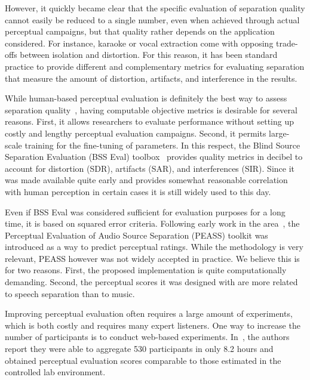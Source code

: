 However, it quickly became clear that the specific evaluation of separation quality cannot easily be reduced to a single number, even when achieved through actual perceptual campaigns, but that quality rather depends on the application considered. For instance, karaoke or vocal extraction come with opposing trade-offs between isolation and distortion. For this reason, it has been standard practice to provide different and complementary metrics for evaluating separation that measure the amount of distortion, artifacts, and interference in the results.

While human-based perceptual evaluation is definitely the best way to assess separation quality~\cite{vincent062,cano11}, having computable objective metrics is desirable for several reasons. First, it allows researchers to evaluate performance without setting up costly and lengthy perceptual evaluation campaigns. Second, it permits large-scale training for the fine-tuning of parameters. In this respect, the Blind Source Separation Evaluation (BSS Eval) toolbox~\cite{fevotte05a,vincent06} provides quality metrics in decibel to account for distortion (SDR), artifacts (SAR), and interferences (SIR). Since it was made available quite early and provides somewhat reasonable correlation with human perception in certain cases \cite{fox07,fox072} it is still widely used to this day.

Even if BSS Eval was considered sufficient for evaluation purposes for a long time, it is based on squared error criteria. Following early work in the area~\cite{kornycky08}, the Perceptual Evaluation of Audio Source Separation (PEASS) toolkit \cite{emiya10,emiya11,vincent122} was introduced as a way to predict perceptual ratings. While the methodology is very relevant, PEASS however was not widely accepted in practice. We believe this is for two reasons. First, the proposed implementation is quite computationally demanding. Second, the perceptual scores it was designed with are more related to speech separation than to music.

Improving perceptual evaluation often requires a large amount of experiments, which is both costly and requires many expert listeners. One way to increase the number of participants is to conduct web-based experiments. In~\cite{cartwright16}, the authors report they were able to aggregate 530 participants in only 8.2 hours and obtained perceptual evaluation scores comparable to those estimated in the controlled lab environment.

